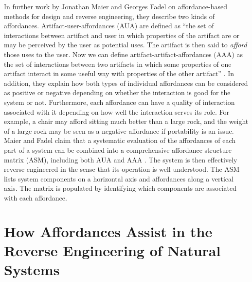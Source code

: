 In further work by Jonathan Maier and Georges Fadel on affordance-based
methods for design and reverse engineering, they describe two kinds of
affordances. Artifact-user-affordances (AUA) are defined as “the set of
interactions between artifact and user in which properties of the
artifact are or may be perceived by the user as potential uses. The
artifact is then said to \textit{afford} those uses to the user. Now we
can define artifact-artifact-affordances (AAA) as the set of
interactions between two artifacts in which some properties of one
artifact interact in some useful way with properties of the other
artifact” \citep{maierfadel2003}. In addition, they explain how both types %
of individual affordances can be considered as positive or negative
depending on whether the interaction is good for the system or not.
Furthermore, each affordance can have a quality of interaction
associated with it depending on how well the interaction serves its
role. For example, a chair may afford sitting much better than a large
rock, and the weight of a large rock may be seen as a negative
affordance if portability is an issue. Maier and Fadel claim that a
systematic evaluation of the affordances of each part of a system can
be combined into a comprehensive affordance structure matrix (ASM),
including both AUA and AAA . The system is then
effectively reverse engineered in the sense that its operation is well
understood. The ASM lists system components on a horizontal axis and
affordances along a vertical axis. The matrix is populated by
identifying which components are associated with each affordance.

\section[How Affordances Assist]{How Affordances Assist in the Reverse Engineering of Natural Systems}

